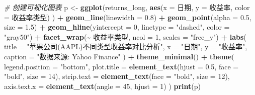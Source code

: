 \documentclass[]{ctexbook}
\newenvironment{Shaded}{\begin{snugshade}}{\end{snugshade}}
\newcommand{\AttributeTok}[1]{\textcolor[rgb]{0.13,0.29,0.53}{#1}}
\newcommand{\CommentTok}[1]{\textcolor[rgb]{0.56,0.35,0.01}{\textit{#1}}}
\newcommand{\DecValTok}[1]{\textcolor[rgb]{0.00,0.00,0.81}{#1}}
\newcommand{\FloatTok}[1]{\textcolor[rgb]{0.00,0.00,0.81}{#1}}
\newcommand{\FunctionTok}[1]{\textcolor[rgb]{0.13,0.29,0.53}{\textbf{#1}}}
\newcommand{\NormalTok}[1]{#1}
\newcommand{\OtherTok}[1]{\textcolor[rgb]{0.56,0.35,0.01}{#1}}
\newcommand{\SpecialCharTok}[1]{\textcolor[rgb]{0.81,0.36,0.00}{\textbf{#1}}}
\newcommand{\StringTok}[1]{\textcolor[rgb]{0.31,0.60,0.02}{#1}}
\begin{document}
\begin{Shaded}
\begin{Highlighting}[]
\CommentTok{\# 创建可视化图表}
\NormalTok{p }\OtherTok{\textless{}{-}} \FunctionTok{ggplot}\NormalTok{(returns\_long, }
            \FunctionTok{aes}\NormalTok{(}\AttributeTok{x =}\NormalTok{ 日期, }
                \AttributeTok{y =}\NormalTok{ 收益率, }
                \AttributeTok{color =}\NormalTok{ 收益率类型)}
\NormalTok{            ) }\SpecialCharTok{+}
  \FunctionTok{geom\_line}\NormalTok{(}\AttributeTok{linewidth =} \FloatTok{0.8}\NormalTok{) }\SpecialCharTok{+}
  \FunctionTok{geom\_point}\NormalTok{(}\AttributeTok{alpha =} \FloatTok{0.5}\NormalTok{, }\AttributeTok{size =} \FloatTok{1.5}\NormalTok{) }\SpecialCharTok{+}
  \FunctionTok{geom\_hline}\NormalTok{(}\AttributeTok{yintercept =} \DecValTok{0}\NormalTok{, }
             \AttributeTok{linetype =} \StringTok{"dashed"}\NormalTok{, }
             \AttributeTok{color =} \StringTok{"gray50"}\NormalTok{) }\SpecialCharTok{+}
  \FunctionTok{facet\_wrap}\NormalTok{(}\SpecialCharTok{\textasciitilde{}}\NormalTok{ 收益率类型, }
             \AttributeTok{ncol =} \DecValTok{1}\NormalTok{, }
             \AttributeTok{scales =} \StringTok{"free\_y"}\NormalTok{) }\SpecialCharTok{+}
  \FunctionTok{labs}\NormalTok{(}
    \AttributeTok{title =} \StringTok{"苹果公司(AAPL)不同类型收益率对比分析"}\NormalTok{,}
    \AttributeTok{x =} \StringTok{"日期"}\NormalTok{,}
    \AttributeTok{y =} \StringTok{"收益率"}\NormalTok{,}
    \AttributeTok{caption =} \StringTok{"数据来源: Yahoo Finance"}
\NormalTok{  ) }\SpecialCharTok{+}
  \FunctionTok{theme\_minimal}\NormalTok{() }\SpecialCharTok{+}
  \FunctionTok{theme}\NormalTok{(}
    \AttributeTok{legend.position =} \StringTok{"bottom"}\NormalTok{,}
    \AttributeTok{plot.title =} \FunctionTok{element\_text}\NormalTok{(}\AttributeTok{hjust =} \FloatTok{0.5}\NormalTok{, }
                              \AttributeTok{face =} \StringTok{"bold"}\NormalTok{, }
                              \AttributeTok{size =} \DecValTok{14}\NormalTok{),}
    \AttributeTok{strip.text =} \FunctionTok{element\_text}\NormalTok{(}\AttributeTok{face =} \StringTok{"bold"}\NormalTok{, }
                              \AttributeTok{size =} \DecValTok{12}\NormalTok{),}
    \AttributeTok{axis.text.x =} \FunctionTok{element\_text}\NormalTok{(}\AttributeTok{angle =} \DecValTok{45}\NormalTok{, }
                               \AttributeTok{hjust =} \DecValTok{1}\NormalTok{)}
\NormalTok{  )}
\FunctionTok{print}\NormalTok{(p)}
\end{Highlighting}
\end{Shaded}
\end{document}
